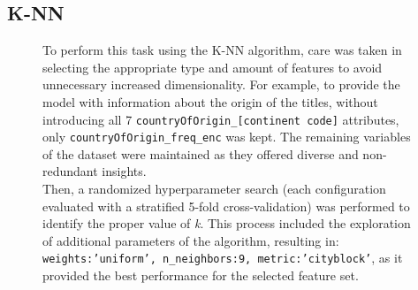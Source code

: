 \subsection{K-NN}
\begin{figure}[H]
    \centering
    \begin{minipage}[t]{0.60\textwidth}
        \vspace{0pt}
        \small
        To perform this task using the K-NN algorithm, care was taken in selecting the appropriate type and amount of features to avoid unnecessary increased dimensionality. 
        For example, to provide the model with information about the origin of the titles, without introducing all 7 \texttt{countryOfOrigin\_[continent code]} attributes, only \texttt{countryOfOrigin\_freq\_enc} was kept. 
        The remaining variables of the dataset were maintained as they offered diverse and non-redundant insights.\\

        Then, a randomized hyperparameter search (each configuration evaluated with a stratified 5-fold cross-validation) was performed to identify the proper value of \textit{k}. 
        This process included the exploration of additional parameters of the algorithm, resulting in: \texttt{weights:'uniform', n\_neighbors:9, metric:'cityblock'}, as it provided the best performance for the selected feature set.\\


\end{minipage}
\end{figure}
